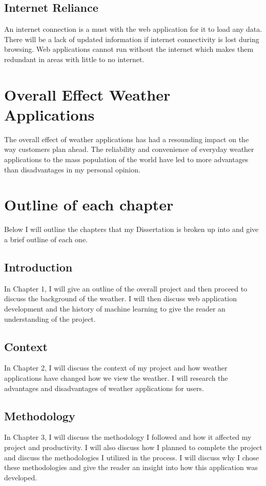\subsection{Internet Reliance}

An internet connection is a must with the web application for it to load any data. There will be a lack of updated information if internet connectivity is lost during browsing. Web applications cannot run without the internet which makes them redundant in areas with little to no internet. 

\section{Overall Effect Weather Applications}

The overall effect of weather applications has had a resounding impact on the way customers plan ahead. The reliability and convenience of everyday weather applications to the mass population of the world have led to more advantages than disadvantages in my personal opinion.
\newpage
\section{Outline of each chapter}
Below I will outline the chapters that my Dissertation is broken up into and give a brief outline of each one.

\subsection{Introduction}
In Chapter 1, I will give an outline of the overall project and then proceed to discuss the background of the weather. I will then discuss web application development and the history of machine learning to give the reader an understanding of the project.

\subsection{Context}
In Chapter 2, I will discuss the context of my project and how weather applications have changed how we view the weather. I will research the advantages and disadvantages of weather applications for users.

\subsection{Methodology}
In Chapter 3, I will discuss the methodology I followed and how it affected my project and productivity. I will also discuss how I planned to complete the project and discuss the methodologies I utilized in the process. I will discuss why I chose these methodologies and give the reader an insight into how this application was developed. 


